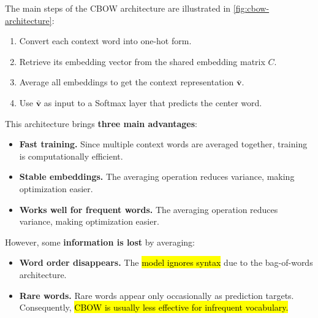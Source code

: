\highspace
The main steps of the CBOW architecture are illustrated in \autoref{fig:cbow-architecture}:
\begin{enumerate}
    \item Convert each context word into one-hot form.
    \item Retrieve its embedding vector from the shared embedding matrix $C$.
    \item Average all embeddings to get the context representation $\bar{\mathbf{v}}$.
    \item Use $\bar{\mathbf{v}}$ as input to a Softmax layer that predicts the center word.
\end{enumerate}
This architecture brings \textbf{three main advantages}:
\begin{itemize}
    \item[\textcolor{Green3}{\faIcon{check}}] \textcolor{Green3}{\textbf{Fast training.}} Since multiple context words are averaged together, training is computationally efficient.
    \item[\textcolor{Green3}{\faIcon{check}}] \textcolor{Green3}{\textbf{Stable embeddings.}} The averaging operation reduces variance, making optimization easier.
    \item[\textcolor{Green3}{\faIcon{check}}] \textcolor{Green3}{\textbf{Works well for frequent words.}} The averaging operation reduces variance, making optimization easier.
\end{itemize}
However, some \textbf{information is lost} by averaging:
\begin{itemize}
    \item[\textcolor{Red2}{\faIcon{times}}] \textcolor{Red2}{\textbf{Word order disappears.}} The \hl{model ignores syntax} due to the bag-of-words architecture.
    \item[\textcolor{Red2}{\faIcon{times}}] \textcolor{Red2}{\textbf{Rare words.}} Rare words appear only occasionally as prediction targets. Consequently, \hl{CBOW is usually less effective for infrequent vocabulary.}
\end{itemize}

\newpage


